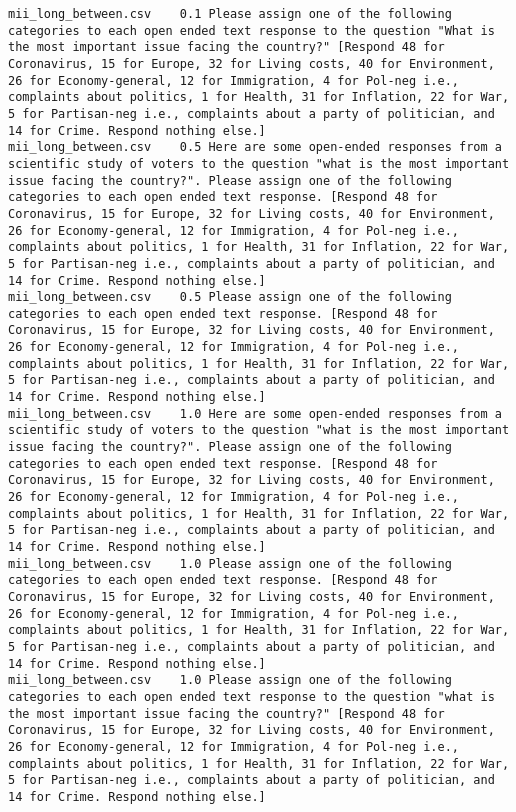 \begin{lstlisting}
mii_long_between.csv	0.1	Please assign one of the following categories to each open ended text response to the question "What is the most important issue facing the country?" [Respond 48 for Coronavirus, 15 for Europe, 32 for Living costs, 40 for Environment, 26 for Economy-general, 12 for Immigration, 4 for Pol-neg i.e., complaints about politics, 1 for Health, 31 for Inflation, 22 for War, 5 for Partisan-neg i.e., complaints about a party of politician, and 14 for Crime. Respond nothing else.]
mii_long_between.csv	0.5	Here are some open-ended responses from a scientific study of voters to the question "what is the most important issue facing the country?". Please assign one of the following categories to each open ended text response. [Respond 48 for Coronavirus, 15 for Europe, 32 for Living costs, 40 for Environment, 26 for Economy-general, 12 for Immigration, 4 for Pol-neg i.e., complaints about politics, 1 for Health, 31 for Inflation, 22 for War, 5 for Partisan-neg i.e., complaints about a party of politician, and 14 for Crime. Respond nothing else.]
mii_long_between.csv	0.5	Please assign one of the following categories to each open ended text response. [Respond 48 for Coronavirus, 15 for Europe, 32 for Living costs, 40 for Environment, 26 for Economy-general, 12 for Immigration, 4 for Pol-neg i.e., complaints about politics, 1 for Health, 31 for Inflation, 22 for War, 5 for Partisan-neg i.e., complaints about a party of politician, and 14 for Crime. Respond nothing else.]
mii_long_between.csv	1.0	Here are some open-ended responses from a scientific study of voters to the question "what is the most important issue facing the country?". Please assign one of the following categories to each open ended text response. [Respond 48 for Coronavirus, 15 for Europe, 32 for Living costs, 40 for Environment, 26 for Economy-general, 12 for Immigration, 4 for Pol-neg i.e., complaints about politics, 1 for Health, 31 for Inflation, 22 for War, 5 for Partisan-neg i.e., complaints about a party of politician, and 14 for Crime. Respond nothing else.]
mii_long_between.csv	1.0	Please assign one of the following categories to each open ended text response. [Respond 48 for Coronavirus, 15 for Europe, 32 for Living costs, 40 for Environment, 26 for Economy-general, 12 for Immigration, 4 for Pol-neg i.e., complaints about politics, 1 for Health, 31 for Inflation, 22 for War, 5 for Partisan-neg i.e., complaints about a party of politician, and 14 for Crime. Respond nothing else.]
mii_long_between.csv	1.0	Please assign one of the following categories to each open ended text response to the question "what is the most important issue facing the country?" [Respond 48 for Coronavirus, 15 for Europe, 32 for Living costs, 40 for Environment, 26 for Economy-general, 12 for Immigration, 4 for Pol-neg i.e., complaints about politics, 1 for Health, 31 for Inflation, 22 for War, 5 for Partisan-neg i.e., complaints about a party of politician, and 14 for Crime. Respond nothing else.]

\end{lstlisting}
